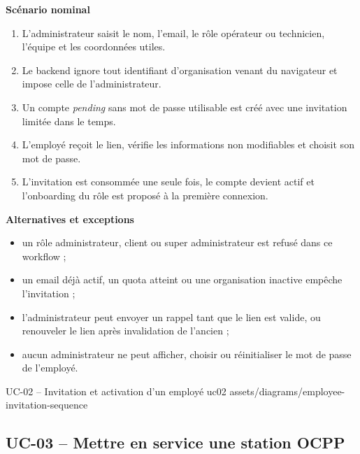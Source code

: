 \textbf{Scénario nominal}
\begin{enumerate}[leftmargin=8mm]
  \item L'administrateur saisit le nom, l'email, le rôle opérateur ou technicien,
  l'équipe et les coordonnées utiles.
  \item Le backend ignore tout identifiant d'organisation venant du navigateur et
  impose celle de l'administrateur.
  \item Un compte \emph{pending} sans mot de passe utilisable est créé avec une
  invitation limitée dans le temps.
  \item L'employé reçoit le lien, vérifie les informations non modifiables et choisit
  son mot de passe.
  \item L'invitation est consommée une seule fois, le compte devient actif et
  l'onboarding du rôle est proposé à la première connexion.
\end{enumerate}

\textbf{Alternatives et exceptions}
\begin{itemize}[leftmargin=7mm]
  \item un rôle administrateur, client ou super administrateur est refusé dans ce
  workflow ;
  \item un email déjà actif, un quota atteint ou une organisation inactive empêche
  l'invitation ;
  \item l'administrateur peut envoyer un rappel tant que le lien est valide, ou
  renouveler le lien après invalidation de l'ancien ;
  \item aucun administrateur ne peut afficher, choisir ou réinitialiser le mot de
  passe de l'employé.
\end{itemize}

\UseCaseUmlPlate
  {UC-02 -- Invitation et activation d'un employé}
  {uc02}
  {assets/diagrams/employee-invitation-sequence}

\subsection{UC-03 -- Mettre en service une station OCPP}

